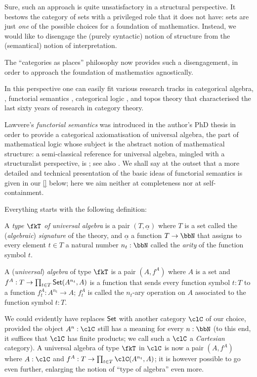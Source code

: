 Sure, such an approach is quite unsatisfactory in a structural perspective. It bestows the category of sets with a privileged role that it does not have: sets are just \emph{one} of the possible choices for a foundation of mathematics. Instead, we would like to disengage the (purely syntactic) notion of structure from the (semantical) notion of interpretation.

The ``categories as places'' philosophy now provides such a disengagement, in order to approach the foundation of mathematics agnostically.%

In this perspective one can easily fit various research tracks in categorical algebra, \cite{Janelidze2004}, functorial semantics \cite{lawvere1963functorial,hyland2007category}, categorical logic \cite{lambek1988introduction}, and topos theory \cite{JohnstonePT} that characterised the last sixty years of research in category theory.

Lawvere's \emph{functorial semantics} was introduced in the author's PhD thesis \cite{lawvere1963functorial} in order to provide a categorical axiomatisation of universal algebra, the part of mathematical logic whose subject is the abstract notion of mathematical structure: a semi-classical reference for universal algebra, mingled with a structuralist perspective, is \cite{manes2012algebraic}; see also \cite{sankappanavar}. We shall say at the outset that a more detailed and technical presentation of the basic ideas of functorial semantics is given in our \autoref{} below; here we aim neither at completeness nor at self-containment.

Everything starts with the following definition:
\begin{definition}\label{unialg}
	A \emph{type $\fkT$ of universal algebra} is a pair $(T,\underline{\alpha})$ where $T$ is a set called the (\emph{algebraic}) \emph{signature} of the theory, and $\underline\alpha$ a function $T \to \bbN$ that assigns to every element $t\in T$ a natural number $n_t : \bbN$ called the \emph{arity} of the function symbol $t$.
\end{definition}
\begin{definition}
	A (\emph{universal}) \emph{algebra} of type $\fkT$ is a pair $(A,f^A)$ where $A$ is a set and $f^A : T \to \prod_{t\in T} \mathsf{Set}(A^{n_t},A )$ is a function that sends every function symbol $t : T$ to a function $f^A_t : A^{n_t} \to A$; $f^A_t$ is called the $n_t$-ary operation on $A$ associated to the function symbol $t : T$.
\end{definition}
We could evidently have replaces $\mathsf{Set}$ with another category $\clC$ of our choice, provided the object $A^n : \clC$ still has a meaning for every $n : \bbN$ (to this end, it suffices that $\clC$ has finite products; we call such a $\clC$ a \emph{Cartesian} category). A universal algebra of type $\fkT$ in $\clC$ is now a pair $(A,f^A)$ where $A : \clC$ and $f^A : T \to \prod_{t\in T} \clC(A^{n_t},A )$; it is however possible to go even further, enlarging the notion of ``type of algebra'' even more.

